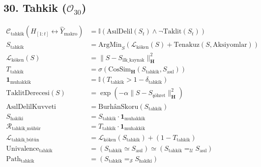 \documentclass[11pt, a4paper]{article}
\begin{document}
\subsection{30. Tahkik ($\mathcal{O}_{30}$)}
\begin{align}
\mathcal{C}_{\text{tahkik}}(H_{[1:t]} \leftrightarrow \hat{Y}_{\text{makro}}) &= \mathbb{I}\left( \text{AsılDelil}(S_t) \land \neg \text{Taklit}(S_t) \right) \\
S_{\text{tahkik}} &= \text{ArgMin}_{S} \left( \mathcal{L}_{\text{köken}}(S) + \text{Tenakuz}(S, \text{Aksiyomlar}) \right) \\
\mathcal{L}_{\text{köken}}(S) &= \| S - S_{\text{ilk\_kaynak}} \|_{\mathbf{H}}^2 \\
T_{\text{tahkik}} &= \sigma\left( \text{CosSim}_{\mathbf{H}}(S_{\text{tahkik}}, S_{\text{asıl}}) \right) \\
\mathbf{1}_{\text{muhakkik}} &= \mathbb{I}(T_{\text{tahkik}} > 1 - \delta_{\text{tahkik}}) \\
\text{TaklitDerecesi}(S) &= \exp(-\alpha \|S - S_{\text{şöhret}}\|_{\mathbf{H}}^2) \\
\text{AsılDelilKuvveti} &= \text{BurhânSkoru}(S_{\text{tahkik}}) \\
S_{\text{hakiki}} &= S_{\text{tahkik}} \cdot \mathbf{1}_{\text{muhakkik}} \\
\mathcal{R}_{\text{tahkik\_mühür}} &= T_{\text{tahkik}} \cdot \mathbf{1}_{\text{muhakkik}} \\
\mathcal{L}_{\text{tahkik\_bütün}} &= \mathcal{L}_{\text{köken}}(S_{\text{tahkik}}) + (1 - T_{\text{tahkik}}) \\
\text{Univalence}_{\text{tahkik}} &= (S_{\text{tahkik}} \simeq S_{\text{asıl}}) \simeq (S_{\text{tahkik}} =_{\mathcal{U}} S_{\text{asıl}}) \\
\text{Path}_{\text{tahkik}} &= (S_{\text{tahkik}} =_{\mathcal{S}} S_{\text{hakiki}})
\end{align}
\end{document}
